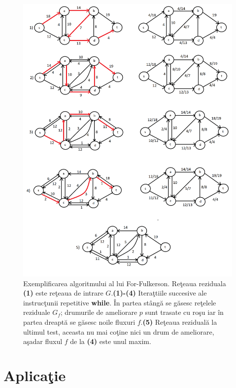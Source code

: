 \documentclass[11pt,a4paper]{report}
\begin{document}
   \vspace{0.3 cm}\begin{figure}[!hbt]
  	\centering
  	\includegraphics[width=13cm]{Ford-Fulkerson.png}
  	\caption{Exemplificarea algoritmului al lui For-Fulkerson. Re\c teaua reziduala \textbf{(1)} este re\c teaua de intrare $G$.\textbf{(1)-(4)} Itera\c ttiile succesive ale instruc\c tunii repetitive \textbf{while}. \^ In partea st\^ ang\u a se g\u asesc re\c telele reziduale $G_f$; drumurile de ameliorare $p$ sunt trasate cu ro\c su iar \^ in partea dreapt\u a se g\u asesc noile fluxuri $f$.\textbf{(5)} Re\c teaua rezidual\u a la ultimul test, aceasta nu mai co\c tine nici un drum de ameliorare, a\c sadar fluxul $f$ de la \textbf{(4)} este unul maxim.}
  \end{figure} 	
   	
   	
     \newpage
     \chapter{Aplica\c tie}
     
\end{document}
